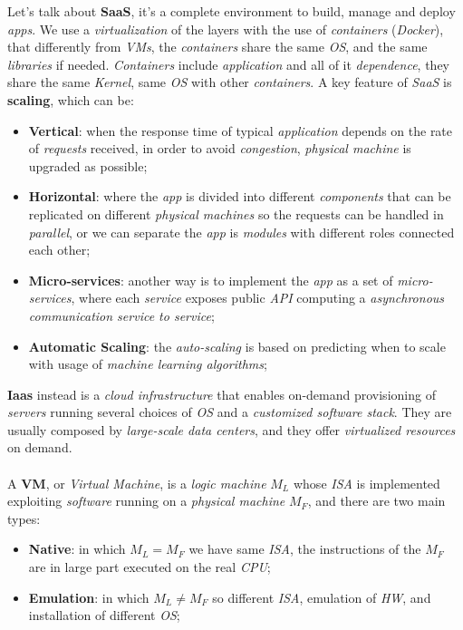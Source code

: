 \documentclass{article}
\begin{document}
Let's talk about \textbf{SaaS}, it's a complete environment to build, manage and deploy \emph{apps}. We use a \emph{virtualization} of the layers with the use of \emph{containers} (\emph{Docker}), that differently from \emph{VMs}, the \emph{containers} share the same \emph{OS}, and the same \emph{libraries} if needed. \emph{Containers} include \emph{application} and all of it \emph{dependence}, they share the same \emph{Kernel}, same \emph{OS} with other \emph{containers}. A key feature of \emph{SaaS} is \textbf{scaling}, which can be:
\begin{itemize}
\item \textbf{Vertical}: when the response time of typical \emph{application} depends on the rate of \emph{requests} received, in order to avoid \emph{congestion}, \emph{physical machine} is upgraded as possible;
\item \textbf{Horizontal}: where the \emph{app} is divided into different \emph{components} that can be replicated on different \emph{physical machines} so the requests can be handled in \emph{parallel}, or we can separate the \emph{app} is \emph{modules} with different roles connected each other;
\item \textbf{Micro-services}: another way is to implement the \emph{app} as a set of \emph{micro-services}, where each \emph{service} exposes public \emph{API} computing a \emph{asynchronous communication service to service};
\item \textbf{Automatic Scaling}: the \emph{auto-scaling} is based on predicting when to scale with usage of \emph{machine learning algorithms};
\end{itemize}
\textbf{Iaas} instead is a \emph{cloud infrastructure} that enables on-demand provisioning of \emph{servers} running several choices of \emph{OS} and a \emph{customized software stack}. They are usually composed by \emph{large-scale data centers}, and they offer \emph{virtualized resources} on demand. \\\\
A \textbf{VM}, or \emph{Virtual Machine}, is a \emph{logic machine} $M_L$ whose \emph{ISA} is implemented exploiting \emph{software} running on a \emph{physical machine} $M_F$, and there are two main types:
\begin{itemize}
\item \textbf{Native}: in which $M_L = M_F$ we have same \emph{ISA}, the instructions of the $M_F$ are in large part executed on the real \emph{CPU};
\item \textbf{Emulation}: in which $M_L \neq M_F$ so different \emph{ISA}, emulation of \emph{HW}, and installation of different \emph{OS};
\end{itemize}
\end{document}
